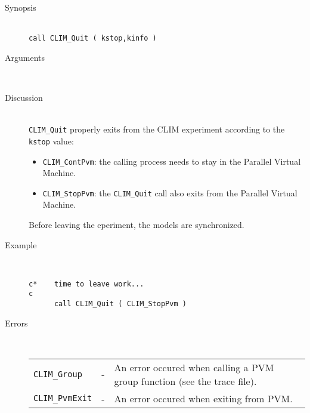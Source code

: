 %
%
\begin{description}
  \item[Synopsis]~ \\[10pt]
    {\tt call CLIM\_Quit ( kstop,kinfo )}
  \item[Arguments]~
  \item[Discussion]~\\[10pt]
    {\tt CLIM\_Quit} properly exits from the CLIM experiment according
    to the {\tt kstop} value:
    \begin{itemize}
      \item {\tt CLIM\_ContPvm}: the calling process needs to stay in
            the Parallel Virtual Machine.
      \item {\tt CLIM\_StopPvm}: the {\tt CLIM\_Quit} call also exits
            from the Parallel Virtual Machine.
    \end{itemize}
    Before leaving the eperiment, the models are synchronized.
  \item[Example]~
    \begin{verbatim}
c*    time to leave work...
c
      call CLIM_Quit ( CLIM_StopPvm )
    \end{verbatim}
  \item[Errors]~\\[10pt]
    \begin{tabular}{l l p{10cm} }
      {\tt CLIM\_Group} & - & An error occured when calling a PVM group
function (see the trace file). \\
      {\tt CLIM\_PvmExit} & - & An error occured when exiting from PVM. \\
    \end{tabular}
\end{description}
